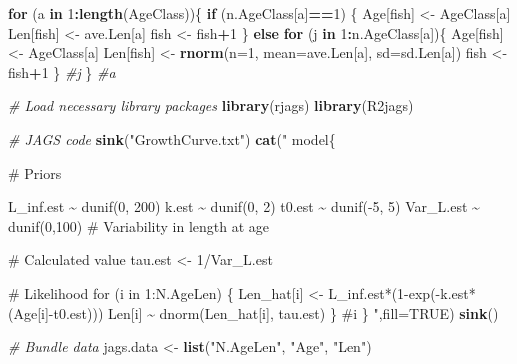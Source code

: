 \documentclass[
]{krantz}
\makeatletter
\newenvironment{Shaded}{\begin{snugshade}}{\end{snugshade}}
\newcommand{\AttributeTok}[1]{\textcolor[rgb]{0.27,0.27,0.27}{#1}}
\newcommand{\CommentTok}[1]{\textcolor[rgb]{0.37,0.37,0.37}{\textit{#1}}}
\newcommand{\ConstantTok}[1]{\textcolor[rgb]{0.37,0.37,0.37}{#1}}
\newcommand{\ControlFlowTok}[1]{\textcolor[rgb]{0.27,0.27,0.27}{\textbf{#1}}}
\newcommand{\DecValTok}[1]{\textcolor[rgb]{0.06,0.06,0.06}{#1}}
\newcommand{\FunctionTok}[1]{\textcolor[rgb]{0.27,0.27,0.27}{\textbf{#1}}}
\newcommand{\NormalTok}[1]{#1}
\newcommand{\OtherTok}[1]{\textcolor[rgb]{0.37,0.37,0.37}{#1}}
\newcommand{\SpecialCharTok}[1]{\textcolor[rgb]{0.43,0.43,0.43}{\textbf{#1}}}
\newcommand{\StringTok}[1]{\textcolor[rgb]{0.5,0.5,0.5}{#1}}
\newenvironment{kframe}{%
\medskip{}
\setlength{\fboxsep}{.8em}
 \def\at@end@of@kframe{}%
 \ifinner\ifhmode%
  \def\at@end@of@kframe{\end{minipage}}%
  \begin{minipage}{\columnwidth}%
 \fi\fi%
 \def\FrameCommand##1{\hskip\@totalleftmargin \hskip-\fboxsep
 \colorbox{shadecolor}{##1}\hskip-\fboxsep
     \hskip-\linewidth \hskip-\@totalleftmargin \hskip\columnwidth}%
 \MakeFramed {\advance\hsize-\width
   \@totalleftmargin\z@ \linewidth\hsize
   \@setminipage}}%
 {\par\unskip\endMakeFramed%
 \at@end@of@kframe}
\renewenvironment{Shaded}{\begin{kframe}}{\end{kframe}}
\makeatother
\begin{document}
\begin{Shaded}
\begin{Highlighting}[]
\ControlFlowTok{for}\NormalTok{ (a }\ControlFlowTok{in} \DecValTok{1}\SpecialCharTok{:}\FunctionTok{length}\NormalTok{(AgeClass))\{}
  \ControlFlowTok{if}\NormalTok{ (n.AgeClass[a]}\SpecialCharTok{==}\DecValTok{1}\NormalTok{) \{}
\NormalTok{    Age[fish] }\OtherTok{\textless{}{-}}\NormalTok{ AgeClass[a]}
\NormalTok{    Len[fish] }\OtherTok{\textless{}{-}}\NormalTok{ ave.Len[a]}
\NormalTok{    fish }\OtherTok{\textless{}{-}}\NormalTok{ fish}\SpecialCharTok{+}\DecValTok{1}
\NormalTok{  \} }\ControlFlowTok{else}
    \ControlFlowTok{for}\NormalTok{ (j }\ControlFlowTok{in} \DecValTok{1}\SpecialCharTok{:}\NormalTok{n.AgeClass[a])\{}
\NormalTok{      Age[fish] }\OtherTok{\textless{}{-}}\NormalTok{ AgeClass[a]}
\NormalTok{      Len[fish] }\OtherTok{\textless{}{-}} \FunctionTok{rnorm}\NormalTok{(}\AttributeTok{n=}\DecValTok{1}\NormalTok{, }\AttributeTok{mean=}\NormalTok{ave.Len[a], }\AttributeTok{sd=}\NormalTok{sd.Len[a])}
\NormalTok{      fish }\OtherTok{\textless{}{-}}\NormalTok{ fish}\SpecialCharTok{+}\DecValTok{1}
\NormalTok{    \} }\CommentTok{\#j}
\NormalTok{\} }\CommentTok{\#a}

\CommentTok{\# Load necessary library packages}
\FunctionTok{library}\NormalTok{(rjags)}
\FunctionTok{library}\NormalTok{(R2jags)}

\CommentTok{\# JAGS code}
\FunctionTok{sink}\NormalTok{(}\StringTok{"GrowthCurve.txt"}\NormalTok{)}
\FunctionTok{cat}\NormalTok{(}\StringTok{"}
\StringTok{model\{}

\StringTok{\# Priors}

\StringTok{ L\_inf.est \textasciitilde{} dunif(0, 200)}
\StringTok{ k.est \textasciitilde{} dunif(0, 2)}
\StringTok{ t0.est \textasciitilde{} dunif({-}5, 5)}
\StringTok{ Var\_L.est \textasciitilde{} dunif(0,100)   \# Variability in length at age}

\StringTok{\# Calculated value}
\StringTok{ tau.est \textless{}{-} 1/Var\_L.est}

\StringTok{\# Likelihood}
\StringTok{ for (i in 1:N.AgeLen) \{}
\StringTok{    Len\_hat[i] \textless{}{-} L\_inf.est*(1{-}exp({-}k.est*(Age[i]{-}t0.est)))}
\StringTok{    Len[i] \textasciitilde{} dnorm(Len\_hat[i], tau.est)}
\StringTok{ \} \#i}
\StringTok{\}}
\StringTok{    "}\NormalTok{,}\AttributeTok{fill=}\ConstantTok{TRUE}\NormalTok{)}
\FunctionTok{sink}\NormalTok{()}

\CommentTok{\# Bundle data}
\NormalTok{jags.data }\OtherTok{\textless{}{-}} \FunctionTok{list}\NormalTok{(}\StringTok{"N.AgeLen"}\NormalTok{, }\StringTok{"Age"}\NormalTok{, }\StringTok{"Len"}\NormalTok{)}


\end{Highlighting}
\end{Shaded}
\end{document}
